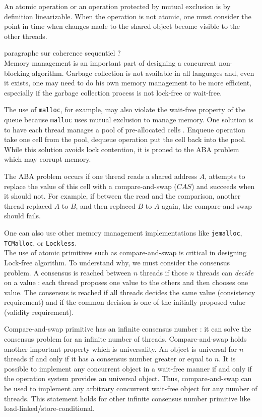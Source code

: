 An atomic operation or an operation protected by mutual exclusion is by
definition linearizable. When the operation is not atomic, one must consider the
point in time when changes made to the shared object become visible to the other
threads.

paragraphe sur coherence sequentiel ? \\

 Memory management is an important part of designing a
concurrent non-blocking algorithm. Garbage collection is not available in all
languages and, even it exists, one may need to do his own memory management to
be more efficient, especially if the garbage collection process is not lock-free
or wait-free.

The use of \texttt{malloc}, for example, may also violate the wait-free property
of the queue because \texttt{malloc} uses mutual exclusion to manage memory. One
solution is to have each thread manages a pool of pre-allocated cells
\cite{Herlihy08}. Enqueue operation take one cell from the pool, dequeue
operation put the cell back into the pool. While this solution avoids lock
contention, it is proned to the ABA problem which may corrupt memory.

The ABA problem occurs if one thread reads a shared address $A$, attempts to
replace the value of this cell with a compare-and-swap ($CAS$) and succeeds when
it should not. For example, if between the read and the comparison, another
thread replaced $A$ to $B$, and then replaced $B$ to $A$ again, the
compare-and-swap should fails.

One can also use other memory management implementations like \texttt{jemalloc},
\texttt{TCMalloc}, or \texttt{Lockless}. \\

 The use of atomic primitives such as compare-and-swap is
critical in designing Lock-free algorithm. To understand why, we must consider
the consensus problem. A consensus is reached between $n$ threads if those $n$
threads can \textit{decide} on a value : each thread proposes one value to the
others and then chooses one value. The consensus is reached if all threads
decides the same value (consistency requirement) and if the common decision is
one of the initially proposed value (validity requirement).

Compare-and-swap primitive has an infinite consensus number
\cite{Herlihy:1991:WS:114005.102808} : it can solve the consensus problem for an
infinite number of threads. Compare-and-swap holds another important property
which is universality. An object is universal for $n$ threads if and only if it
has a consensus number greater or equal to $n$. It is possible to implement any
concurrent object in a wait-free manner if and only if the operation system
provides an universal object. Thus, compare-and-swap can be used to implement
any arbitrary concurrent wait-free object for any number of threads. This
statement holds for other infinite consensus number primitive like
load-linked/store-conditional. \\

